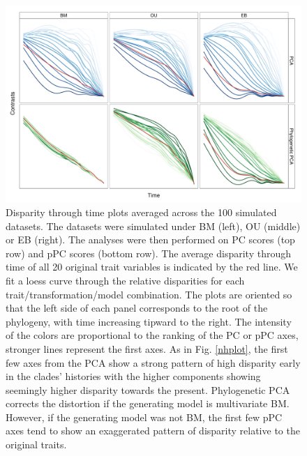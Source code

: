 \documentclass[a4paper,11pt]{article}
\begin{document}
\begin{figure}[p]
\centering
\includegraphics[scale=0.65]{./fig/dtt-2panel.pdf}
\caption{Disparity through time plots averaged across the 100 simulated datasets. The datasets were simulated under BM (left), OU (middle) or EB (right). The analyses were then performed on PC scores (top row) and pPC scores (bottom row). The average disparity through time of all 20 original trait variables is indicated by the red line. We fit a loess curve through the relative disparities for each trait/transformation/model combination. The plots are oriented so that the left side of each panel corresponds to the root of the phylogeny, with time increasing tipward to the right. The intensity of the colors are proportional to the ranking of the PC or pPC axes, stronger lines represent the first axes. As in Fig. \ref{nhplot}, the first few axes from the PCA show a strong pattern of high disparity early in the clades' histories with the higher components showing seemingly higher disparity towards the present. Phylogenetic PCA corrects the distortion if the generating model is multivariate BM. However, if the generating model was not BM, the first few pPC axes tend to show an exaggerated pattern of disparity relative to the original traits.}
\label{dttplot}
\end{figure}
\end{document}
